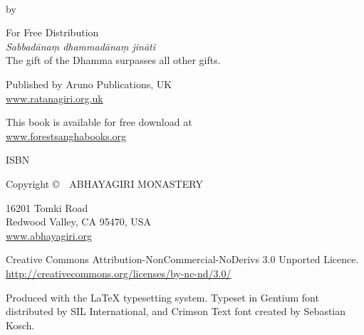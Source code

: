 
\enlargethispage{2\onelineskip}

{\footnotesize\setlength{\parskip}{0.8em}\setlength{\parindent}{0em}%
{\raggedright%

{\color[gray]{0}\thetitle}\\
by \theauthor

For Free Distribution\\
\emph{Sabbadānaṃ dhammadānaṃ jināti}\\
The gift of the Dhamma surpasses all other gifts.

Published by Aruno Publications, UK\\
\href{http://ratanagiri.org.uk/}{www.ratanagiri.org.uk}

This book is available for free download at\\
\href{http://forestsanghabooks.org/}{www.forestsanghabooks.org}

ISBN \theISBN

Copyright \copyright\ \the\year\ ABHAYAGIRI MONASTERY

16201 Tomki Road\\
Redwood Valley, CA 95470, USA\\
\href{http://abhayagiri.org/}{www.abhayagiri.org}

\vfill

{\tiny

Creative Commons Attribution-NonCommercial-NoDerivs 3.0 Unported Licence.\\
\href{http://creativecommons.org/licenses/by-nc-nd/3.0/}{http://creativecommons.org/licenses/by-nc-nd/3.0/}


Produced with the {\selectfont\LaTeX} typesetting system. Typeset in Gentium font distributed by SIL International, and Crimson Text font created by Sebastian Kosch.

\theEditionInfo

}

}}

